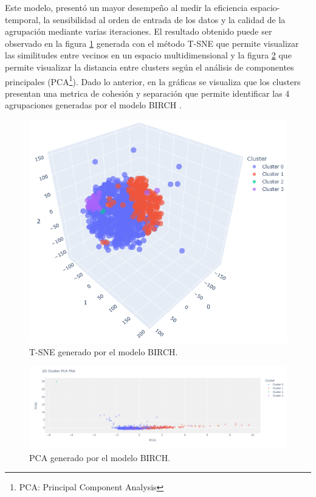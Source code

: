 Este modelo, presentó un mayor desempeño al medir la eficiencia espacio-temporal, la sensibilidad al orden de entrada de los datos y la calidad de la agrupación mediante varias iteraciones. El resultado obtenido puede ser observado en la figura \ref{BIRCH_TSNE} generada con el método T-SNE que permite visualizar las similitudes entre vecinos en un espacio multidimensional y  la figura \ref{BIRCH_PCA} que permite visualizar la distancia entre clusters según el análisis de componentes principales (PCA\footnote{PCA: Principal Component Analysis}). Dado lo anterior, en la gráficas se visualiza que los clusters presentan una metrica de cohesión y separación que permite identificar las 4 agrupaciones generadas por el modelo BIRCH .

\begin{figure}
	\centering
	\includegraphics[width=0.5
	\linewidth]{NOTEBOOK/IMAGENES_CLUSTERING/8_TNSE_Birch_Clustering}
	\caption{T-SNE generado por el modelo BIRCH.}
	\label{BIRCH_TSNE}
\end{figure}

\begin{figure}
	\centering
	\includegraphics[width=1
	\linewidth]{NOTEBOOK/IMAGENES_CLUSTERING/8_PCA_Birch_Clustering}
	\caption{PCA generado por el modelo BIRCH.}
	\label{BIRCH_PCA}
\end{figure}

